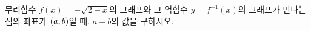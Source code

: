 무리함수 $f(x)=-\sqrt{2-x}$의 그래프와 그 역함수 $y=f^{-1}(x)$의 그래프가 만나는 점의 좌표가 $(a{,}\mkern3mu\mathopen{}b)$일 때, $a+b$의 값을 구하시오.
